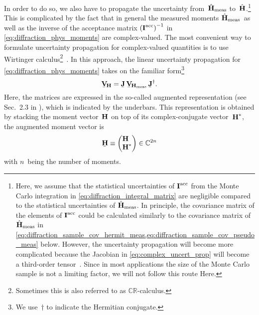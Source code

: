 In order to do so, we also have to propagate the uncertainty
from~$\hat{\bm{\mathrm{H}}}_\text{meas}$ to~$\hat{\bm{\mathrm{H}}}$.\footnote{%
Here, we assume that the statistical uncertainties of $\bm{\mathrm{I}}^\text{acc}$
from the Monte Carlo integration in
\cref{eq:diffraction_integral_matrix} are negligible compared to the
statistical uncertainties of $\hat{\bm{\mathrm{H}}}_\text{meas}$.  In
principle, the covariance matrix of the elements of
$\bm{\mathrm{I}}^\text{acc}$ could be calculated similarly to the
covariance matrix of $\hat{\bm{\mathrm{H}}}_\text{meas}$ in
\cref{eq:diffraction_sample_cov_hermit_meas,eq:diffraction_sample_cov_pseudo_meas}
below.  However, the uncertainty propagation will become more
complicated because the Jacobian in \cref{eq:complex_uncert_prop} will
become a third-order
tensor~\cite{Laue:2018,Laue:2020,matrixcalculus,Sourya:2019,maxtrixcookbook:2012,wikipedia:MatrixCalculus}.
Since in most applications the size of the Monte Carlo sample is not a
limiting factor, we will not follow this route Here.}  This is
complicated by the fact that in general the measured moments
$\hat{\bm{\mathrm{H}}}_\text{meas}$~as well as the inverse of the acceptance
matrix $\rBrk[0]{\mat{I}^\text{acc}}^{-1}$ in
\cref{eq:diffraction_phys_moments} are complex-valued.  The most
convenient way to formulate uncertainty propagation for complex-valued
quantities is to use Wirtinger calculus\footnote{Sometimes this is
also referred to as
$\mathbb{C}\mathbb{R}$-calculus.}~\cite{wikipedia:WirtingerCalculus,Wirtinger:1927,Kreutz-Delgado:2009,Grube:2023}.
In this approach, the linear uncertainty propagation for
\cref{eq:diffraction_phys_moments} takes on the familiar
form\footnote{We use~$\dagger$ to indicate the Hermitian conjugate.}
\begin{equation}
  \label{eq:complex_uncert_prop}
  \underaccent{\bar}{\covMatSym}_{\!\vect{H}}
  = \underaccent{\bar}{\mat{J}}\, \underaccent{\bar}{\covMatSym}_{\!\vect{H}_\text{meas}}\, \underaccent{\bar}{\mat{J}}^\dagger.
\end{equation}
Here, the matrices are expressed in the so-called augmented
representation (see \eg Sec.~2.3 in ), which is
indicated by the underbars.  This representation is obtained by
stacking the moment vector~$\bm{\mathrm{H}}$ on top of its
complex-conjugate vector~$\bm{\mathrm{H}}^*$, \ie the augmented moment
vector is
\begin{equation}
  \underaccent{\bar}{\vect{H}}
  \equiv \begin{pmatrix*}[l]
    \vect{H} \\
    \vect{H}^*
  \end{pmatrix*}
  \in \mathbb{C}^{2n}
\end{equation}
with $n$~being the number of moments.

